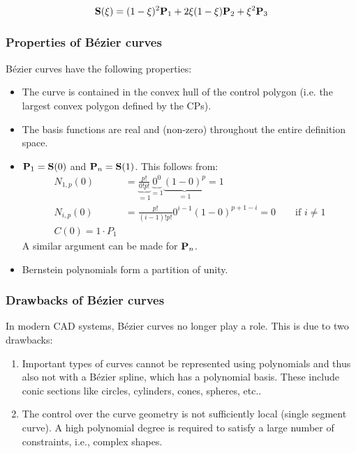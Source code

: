 \documentclass[11pt,a4paper]{article}
\begin{document}
	\begin{align}
        {\bf S}(\xi)=(1-\xi)^{2}{\bf P}_{1}+2\xi (1-\xi){ \bf P}_{2}+\xi^{2}{\bf P}_{3}
	\end{align}


	
\subsubsection{Properties of Bézier curves}

Bézier curves have the following properties:
	\begin{itemize}
		\item The curve is contained in the convex hull of the control polygon (i.e. the largest convex polygon defined by the CPs).
		\item The basis functions are real and (non-zero) throughout the entire definition space.
		\item ${\bf P}_{1}={\bf S}(0)$ and ${\bf P}_{n}={\bf S}(1)$. This follows from:
		\begin{align*}
			N_{1,p}(0)&=\underbrace{\frac{p!}{0!p!}}_{=1}\underbrace{0^{0}}_{=1}\underbrace{(1-0)^{p}}_{=1}=1 \\
			N_{i,p}(0)&=\frac{p!}{(i-1)!p!}0^{i-1}(1-0)^{p+1-i}=0\qquad\text{if }i\neq 1 \\
			C(0)=1\cdot P_{1}
		\end{align*}
        A similar argument can be made for ${\bf P}_n$.

		\item Bernstein polynomials form a partition  of unity.
	
	\end{itemize}
	
	\subsubsection{Drawbacks of Bézier curves}

In modern CAD systems, Bézier curves no longer play a role. This is due to two drawbacks:

	\begin{enumerate}
		\item Important types of curves cannot be represented using polynomials and thus also not with a Bézier spline, which has a polynomial basis. These include conic sections like circles, cylinders, cones, spheres, etc..
		\item The control over the curve geometry is not sufficiently local (single segment curve). A high polynomial degree is required to satisfy a large number of constraints, i.e., complex shapes.
	\end{enumerate}
	
\end{document}
